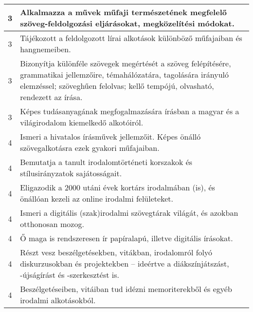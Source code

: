 \begin{longtable}{c | p{12cm} }
                                
                                          3 &  Alkalmazza a művek műfaji természetének megfelelő szöveg-feldolgozási eljárásokat, megközelítési módokat. \\ \hline
                                          3 &  Tájékozott a feldolgozott lírai alkotások különböző műfajaiban és hangnemeiben. \\ \hline
                                          3 &  Bizonyítja különféle szövegek megértését a szöveg felépítésére, grammatikai jellemzőire, témahálózatára, tagolására irányuló elemzéssel; szöveghűen felolvas; kellő tempójú, olvasható, rendezett az írása.  \\ \hline
                                          3 &  Képes tudásanyagának megfogalmazására írásban a magyar és a világirodalom kiemelkedő alkotóiról. \\ \hline
                                      
                                
                                          4 &  Ismeri a hivatalos írásművek jellemzőit. Képes önálló szövegalkotásra ezek gyakori műfajaiban. \\ \hline
                                          4 &  Bemutatja a tanult irodalomtörténeti korszakok és stílusirányzatok sajátosságait. \\ \hline
                                          4 &  Eligazodik a 2000 utáni évek kortárs irodalmában (is), és önállóan kezeli az online irodalmi felületeket. \\ \hline
                                          4 &  Ismeri a digitális (szak)irodalmi szövegtárak világát, és azokban otthonosan mozog. \\ \hline
                                          4 &  Ő maga is rendszeresen ír papíralapú, illetve digitális írásokat. \\ \hline
                                          4 &  Részt vesz beszélgetésekben, vitákban, irodalomról folyó diskurzusokban és projektekben – ideértve a diákszínjátszást, -újságírást és -szerkesztést is. \\ \hline
                                          4 &  Beszélgetéseiben, vitáiban tud idézni memoriterekből és egyéb irodalmi alkotásokból. \\ \hline
                                      
                        \end{longtable}
            \clearpage

